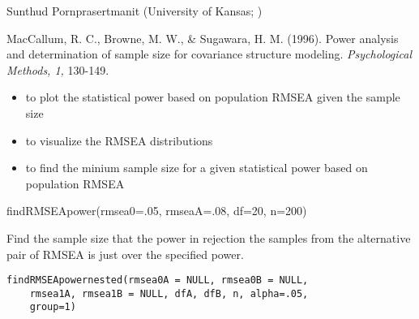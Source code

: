 \documentclass[a4paper]{book}
\begin{document}
%
\begin{Author}\relax
Sunthud Pornprasertmanit (University of Kansas; )
\end{Author}
%
\begin{References}\relax
MacCallum, R. C., Browne, M. W., \& Sugawara, H. M. (1996). Power analysis and determination of sample size for covariance structure modeling. \emph{Psychological Methods, 1,} 130-149.
\end{References}
%
\begin{SeeAlso}\relax
\begin{itemize}

\item {} to plot the statistical power based on population RMSEA given the sample size
\item {} to visualize the RMSEA distributions
\item {} to find the minium sample size for a given statistical power based on population RMSEA

\end{itemize}

\end{SeeAlso}
%
\begin{Examples}
\begin{ExampleCode}
findRMSEApower(rmsea0=.05, rmseaA=.08, df=20, n=200)
\end{ExampleCode}
\end{Examples}
%
\begin{Description}\relax
Find the sample size that the power in rejection the samples from the alternative pair of RMSEA is just over the specified power.
\end{Description}
%
\begin{Usage}
\begin{verbatim}
findRMSEApowernested(rmsea0A = NULL, rmsea0B = NULL, 
	rmsea1A, rmsea1B = NULL, dfA, dfB, n, alpha=.05, 
	group=1)
\end{verbatim}
\end{Usage}
%
\end{document}
